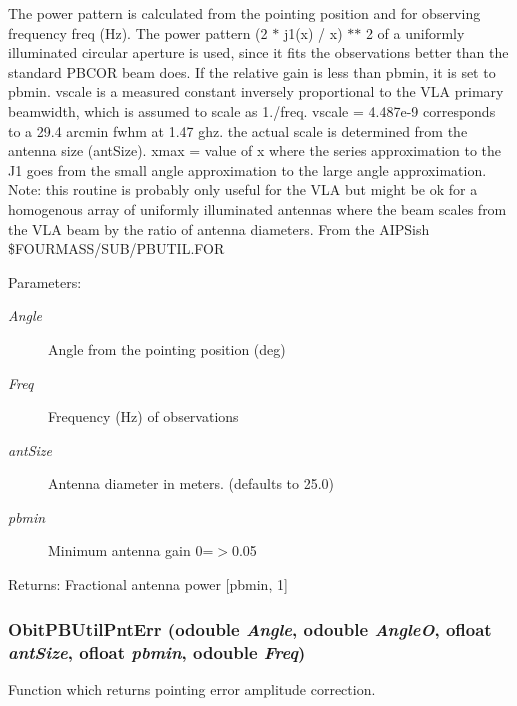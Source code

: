 The power pattern is calculated from the pointing position and for observing frequency freq (Hz). The power pattern (2 $\ast$ j1(x) / x) $\ast$$\ast$ 2 of a uniformly illuminated circular aperture is used, since it fits the observations better than the standard PBCOR beam does. If the relative gain is less than pbmin, it is set to pbmin. vscale is a measured constant inversely proportional to the VLA primary beamwidth, which is assumed to scale as 1./freq. vscale = 4.487e-9 corresponds to a 29.4 arcmin fwhm at 1.47 ghz. the actual scale is determined from the antenna size (ant\-Size). xmax = value of x where the series approximation to the J1 goes from the small angle approximation to the large angle approximation. Note: this routine is probably only useful for the VLA but might be ok for a homogenous array of uniformly illuminated antennas where the beam scales from the VLA beam by the ratio of antenna diameters. From the AIPSish \$FOURMASS/SUB/PBUTIL.FOR \begin{Desc}
\item[Parameters:]
\begin{description}
\item[{\em Angle}]Angle from the pointing position (deg) \item[{\em Freq}]Frequency (Hz) of observations \item[{\em ant\-Size}]Antenna diameter in meters. (defaults to 25.0) \item[{\em pbmin}]Minimum antenna gain 0=$>$0.05 \end{description}
\end{Desc}
\begin{Desc}
\item[Returns:]Fractional antenna power [pbmin, 1] \end{Desc}
\subsubsection{ Obit\-PBUtil\-Pnt\-Err ({\bf odouble} {\em Angle}, {\bf odouble} {\em Angle\-O}, {\bf ofloat} {\em ant\-Size}, {\bf ofloat} {\em pbmin}, {\bf odouble} {\em Freq})}\label{ObitPBUtil_8h_a3}


Function which returns pointing error amplitude correction. 


